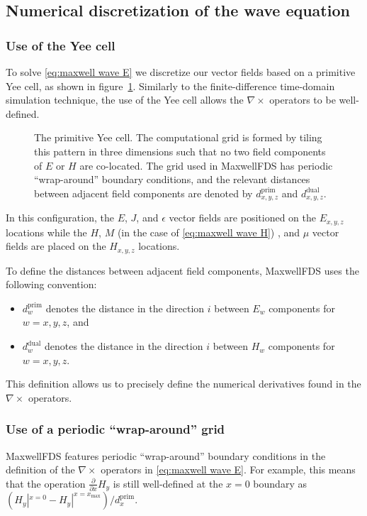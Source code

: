 \documentclass{article}
\newcommand{\curl}{\nabla\times}
\newcommand{\eq}[1]{\eqref{eq:#1}}
\newcommand{\fig}[1]{figure~\ref{fig:#1}}
\newcommand{\MaxwellFDS}{MaxwellFDS }
\newcommand{\BI}{\begin{itemize}\item}
\newcommand{\EI}{\end{itemize}}
\newcommand{\I}{\item}
\newcommand{\pf}[1]{\frac{\partial}{\partial #1}} %
\newcommand{\prim}{\text{prim}}
\newcommand{\dual}{\text{dual}}
\newcommand{\mx}{\text{max}}
\begin{document}
\subsection{Numerical discretization of the wave equation}
\subsubsection{Use of the Yee cell}
To solve \eq{maxwell wave E} we discretize our vector fields 
    based on a primitive Yee cell, as shown in \fig{yee cell}. %
Similarly to the finite-difference time-domain simulation technique,
    the use of the Yee cell allows the $\curl$ operators to be well-defined.

\begin{figure}[ht]\begin{center}
    
    \end{center}
    \caption{   The primitive Yee cell. 
                The computational grid is formed by tiling this pattern
                    in three dimensions such that no two field components
                    of $E$ or $H$ are co-located. %
                The grid used in \MaxwellFDS has periodic ``wrap-around''
                    boundary conditions, and 
                    the relevant distances between adjacent field components
                    are denoted by $d^\prim_{x,y,z}$ and 
                    $d^\dual_{x,y,z}$.}
    \label{fig:yee cell}
\end{figure}

In this configuration, the $E$, $J$, and $\epsilon$ vector fields
    are positioned on the $E_{x,y,z}$ locations 
    while the $H$, $M$ (in the case of \eq{maxwell wave H}) , and $\mu$
    vector fields are placed on the $H_{x,y,z}$ locations.

To define the distances between adjacent field components,
    \MaxwellFDS uses the following convention:
    \BI $d^\prim_{w}$ denotes the distance in the direction $i$
        between $E_w$ components for $w = x, y, z$, and
    \I  $d^\dual_{w}$ denotes the distance in the direction $i$
        between $H_w$ components for $w = x, y, z$. \EI
This definition allows us to precisely define the numerical derivatives
    found in the $\curl$ operators.
    
\subsubsection{Use of a periodic ``wrap-around'' grid}
\MaxwellFDS features periodic ``wrap-around'' boundary conditions
    in the definition of the $\curl$ operators in \eq{maxwell wave E}.
For example, this means that the operation $\pf{x}H_y$ is still well-defined
    at the $x=0$ boundary as 
    $(H_y|^{x=0} - H_y|^{x = x_\mx}) / d^\prim_x$.
\end{document}
